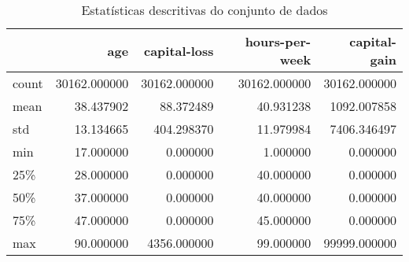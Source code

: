 \begin{table}
\centering
\caption{Estatísticas descritivas do conjunto de dados}
\label{tbl:descriptive_statistics}
\begin{tabular}{lrrrr}
\toprule
{} &           age &  capital-loss &  hours-per-week &  capital-gain \\
\midrule
count &  30162.000000 &  30162.000000 &    30162.000000 &  30162.000000 \\
mean  &     38.437902 &     88.372489 &       40.931238 &   1092.007858 \\
std   &     13.134665 &    404.298370 &       11.979984 &   7406.346497 \\
min   &     17.000000 &      0.000000 &        1.000000 &      0.000000 \\
25\%   &     28.000000 &      0.000000 &       40.000000 &      0.000000 \\
50\%   &     37.000000 &      0.000000 &       40.000000 &      0.000000 \\
75\%   &     47.000000 &      0.000000 &       45.000000 &      0.000000 \\
max   &     90.000000 &   4356.000000 &       99.000000 &  99999.000000 \\
\bottomrule
\end{tabular}
\end{table}
